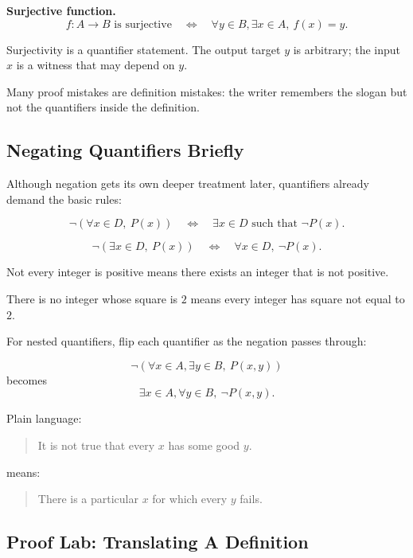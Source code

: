 \textbf{Surjective function.}
\[
f:A\to B\text{ is surjective}
\quad\Longleftrightarrow\quad
\forall y\in B,\exists x\in A,\ f(x)=y.
\]

Surjectivity is a quantifier statement. The output target $y$ is arbitrary; the input $x$ is a witness that may depend on $y$.

\begin{trapbox}
Many proof mistakes are definition mistakes: the writer remembers the slogan but not the quantifiers inside the definition.
\end{trapbox}

\subsection{Negating Quantifiers Briefly}

Although negation gets its own deeper treatment later, quantifiers already demand the basic rules:

\[
\neg(\forall x\in D,\ P(x))
\quad\Longleftrightarrow\quad
\exists x\in D\text{ such that }\neg P(x).
\]

\[
\neg(\exists x\in D,\ P(x))
\quad\Longleftrightarrow\quad
\forall x\in D,\ \neg P(x).
\]

Not every integer is positive means there exists an integer that is not positive.

There is no integer whose square is $2$ means every integer has square not equal to $2$.

For nested quantifiers, flip each quantifier as the negation passes through:

\[
\neg\left(\forall x\in A,\exists y\in B,\ P(x,y)\right)
\]
becomes
\[
\exists x\in A,\forall y\in B,\ \neg P(x,y).
\]

Plain language:

\begin{quote}
It is not true that every $x$ has some good $y$.
\end{quote}

means:

\begin{quote}
There is a particular $x$ for which every $y$ fails.
\end{quote}

\subsection{Proof Lab: Translating A Definition}

